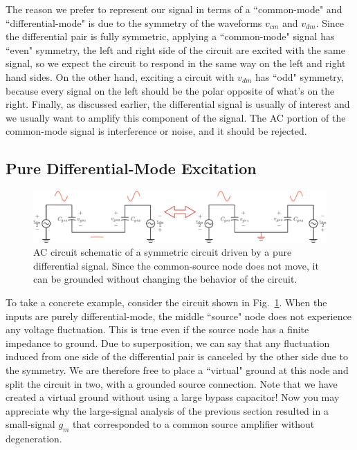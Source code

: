 %
The reason we prefer to represent our signal in terms of a ``common-mode" and ``differential-mode" is due to the symmetry of the waveforms $v_{cm}$ and $v_{dm}$.  Since the differential pair is fully symmetric, applying a ``common-mode" signal has ``even" symmetry, the left and right side of the circuit are excited with the same signal, so we expect the circuit to respond in the same way on the left and right hand sides.  On the other hand, exciting a circuit with $v_{dm}$ has ``odd" symmetry, because every signal on the left should be the polar opposite of what's on the right.	Finally, as discussed earlier, the differential signal is usually of interest and we usually want to amplify this component of the signal. The AC portion of the common-mode signal is interference or noise, and it should be rejected.  


\subsection{Pure Differential-Mode Excitation}

\begin{figure}[tb]
\begin{center}
\includegraphics[width=\columnwidth]{DM_model.pdf}
\end{center}
\caption{AC circuit schematic of a symmetric circuit driven by a pure differential signal.  Since the common-source node does not move, it can be grounded without changing the behavior of the circuit.} \label{fig:DM_model.pdf}
\end{figure}


To take a concrete example, consider the circuit shown in Fig.~\ref{fig:DM_model.pdf}. When the inputs are purely differential-mode, the middle ``source" node does not experience any voltage fluctuation.  This is true even if the source node has a finite impedance to ground.  Due to superposition, we can say that any fluctuation induced from one side of the differential pair is canceled by the other side due to the symmetry. We are therefore free to place a ``virtual" ground at this node and split the circuit in two, with a grounded source connection.  Note that we have created a virtual ground without using a large bypass capacitor!  Now you may appreciate why the large-signal analysis of the previous section resulted in a small-signal $g_m$ that corresponded to a common source amplifier without degeneration. 
 


